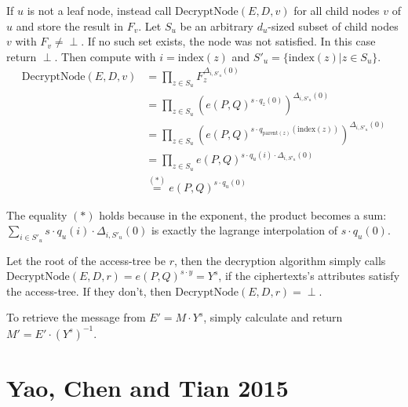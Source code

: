 If $u$ is not a leaf node, instead call $\text{DecryptNode}(E, D, v)$ for all child nodes $v$ of $u$ and store the result in $F_v$.
Let $S_u$ be an arbitrary $d_u$-sized subset of child nodes $v$ with $F_v \neq \perp$. If no such set exists, the node was not satisfied. In this case return $\perp$.
Then compute with $i = \text{index}(z)$ and $S'_u = \{\text{index}(z) | z \in S_u\}$.
\begin{equation}
    \begin{split}
        \text{DecryptNode}(E, D, v) &= \prod_{z \in S_u} F_z^{\Delta_{i,S'_u}(0)}\\
        &= \prod_{z \in S_u} (e(P,Q)^{s\cdot q_z(0)})^{\Delta_{i,S'_u}(0)}\\
        &= \prod_{z \in S_u} (e(P,Q)^{s\cdot q_{\text{parent}(z)}(\text{index}(z))})^{\Delta_{i,S'_u}(0)}\\
        &= \prod_{z \in S_u} e(P,Q)^{s\cdot q_u(i) \cdot \Delta_{i,S'_u}(0)}\\
        &\stackrel{(*)}{=} e(P,Q)^{s \cdot q_u(0)}
    \end{split}
\end{equation}

The equality $(*)$ holds because in the exponent, the product becomes a sum: $\sum_{i\in S'_u} s \cdot q_u(i) \cdot \Delta_{i,S'_u}(0)$ is exactly the lagrange interpolation of $s \cdot q_u(0)$.

Let the root of the \gls{access-tree} be $r$, then the decryption algorithm simply calls $\text{DecryptNode}(E, D, r) = e(P,Q)^{s \cdot y} = Y^s$, if the ciphertexts's attributes satisfy the \gls{access-tree}.
If they don't, then $\text{DecryptNode}(E, D, r) = \perp$.

To retrieve the message from $E' = M \cdot Y^s$, simply calculate and return $M' = E' \cdot (Y^s)^{-1}$.


\section{Yao, Chen and Tian 2015}\label{sec:yct}

